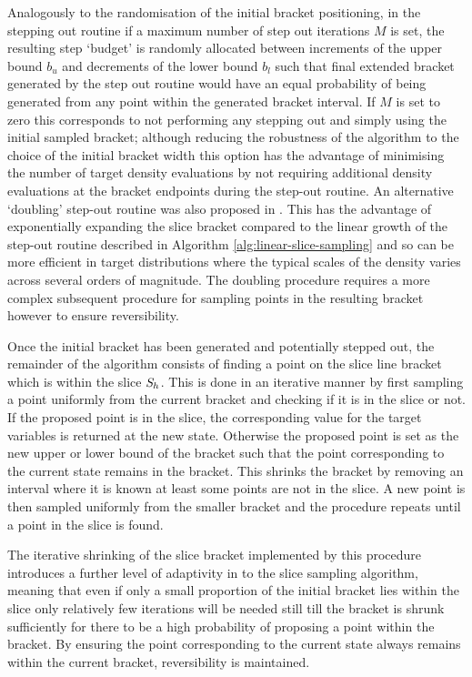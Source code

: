 Analogously to the randomisation of the initial bracket positioning, in the stepping out routine if a maximum number of step out iterations $M$ is set, the resulting step `budget' is randomly allocated between increments of the upper bound $b_u$ and decrements of the lower bound $b_l$ such that final extended bracket generated by the step out routine would have an equal probability of being generated from any point within the generated bracket interval. If $M$ is set to zero this corresponds to not performing any stepping out and simply using the initial sampled bracket; although reducing the robustness of the algorithm to the choice of the initial bracket width this option has the advantage of minimising the number of target density evaluations by not requiring additional density evaluations at the bracket endpoints during the step-out routine. An alternative `doubling' step-out routine was also proposed in \citep{neal2003slice}. This has the advantage of exponentially expanding the slice bracket compared to the linear growth of the step-out routine described in Algorithm \ref{alg:linear-slice-sampling} and so can be more efficient in target distributions where the typical scales of the density varies across several orders of magnitude. The doubling procedure requires a more complex subsequent procedure for sampling points in the resulting bracket however to ensure reversibility. 

Once the initial bracket has been generated and potentially stepped out, the remainder of the algorithm consists of finding a point on the slice line bracket which is within the slice $\mathit{S}_h$. This is done in an iterative manner by first sampling a point uniformly from the current bracket and checking if it is in the slice or not. If the proposed point is in the slice, the corresponding value for the target variables is returned at the new state. Otherwise the proposed point is set as the new upper or lower bound of the bracket such that the point corresponding to the current state remains in the bracket. This shrinks the bracket by removing an interval where it is known at least some points are not in the slice. A new point is then sampled uniformly from the smaller bracket and the procedure repeats until a point in the slice is found.

The iterative shrinking of the slice bracket implemented by this procedure introduces a further level of adaptivity in to the slice sampling algorithm, meaning that even if only a small proportion of the initial bracket lies within the slice only relatively few iterations will be needed still till the bracket is shrunk sufficiently for there to be a high probability of proposing a point within the bracket. By ensuring the point corresponding to the current state always remains within the current bracket, reversibility is maintained.

